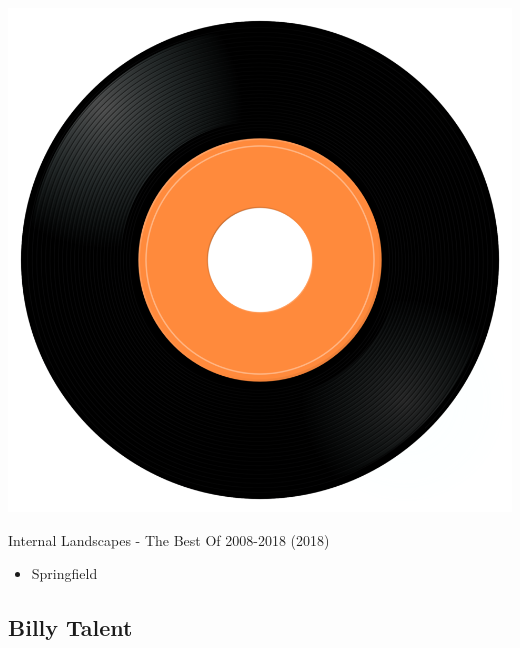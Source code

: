 \begin{minipage}[t]{0.25\textwidth}
\captionsetup{type=figure}
\includegraphics[width=\textwidth]{Images/cover.png}
\caption*{Internal Landscapes - The Best Of 2008-2018 (2018)}
\end{minipage}
\begin{minipage}[t]{0.25\textwidth}\vspace{0pt}
\begin{itemize}[nosep,leftmargin=1em,labelwidth=*,align=left]
	\setlength{\itemsep}{0pt}
	\item Springfield
\end{itemize}
\end{minipage}

\subsection{Billy Talent}

